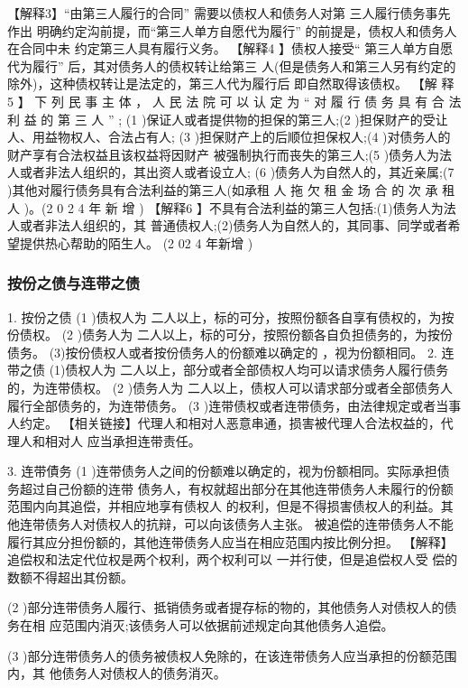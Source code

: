 \documentclass[UTF8,12pt]{ctexart}
\numberwithin{equation}{section} %
\numberwithin{figure}{section}
\numberwithin{table}{section}
\begin{document}
	【解释3】“由第三人履行的合同” 需要以债权人和债务人对第 三人履行债务事先作出 明确约定沟前提，而“第三人单方自愿代为履行” 的前提是，债权人和债务人在合同中未 约定第三人具有履行义务。
	【解释4 】债权人接受“ 第三人单方自愿代为履行” 后，其对债务人的债权转让给第三 人(但是债务人和第三人另有约定的除外)，这种债权转让是法定的，第三人代为履行后 即自然取得该债权。
	【解 释 5 】 下 列 民 事 主 体 ， 人 民 法 院 可 以 认 定 为 “ 对 履 行 债 务 具 有 合 法 利 益 的 第 三 人 ” ; (1 )保证人或者提供物的担保的第三人;(2 )担保财产的受让人、用益物权人、合法占有人; (3 )担保财产上的后顺位担保权人;(4 )对债务人的财产享有合法权益且该权益将因财产 被强制执行而丧失的第三人;(5 )债务人为法人或者非法人组织的，其出资人或者设立人; (6 )债务人为自然人的，其近亲属;(7 )其他对履行债务具有合法利益的第三人(如承租 人 拖 欠 租 金 场 合 的 次 承 租 人 )。(2 0 2 4 年 新 增 )
	【解释6 】不具有合法利益的第三人包括:(1)债务人为法人或者非法人组织的，其 普通债权人;(2)债务人为自然人的，其同事、同学或者希望提供热心帮助的陌生人。 (2 02 4 年新增 )
	
	\subsubsection{按份之债与连带之债}
	1. 按份之债
	(1 )债权人为 二人以上，标的可分，按照份额各自享有债权的，为按份债权。
	(2 )债务人为 二人以上，标的可分，按照份额各自负担债务的，为按份债务。 (3)按份债权人或者按份债务人的份额难以确定的 ，视为份额相同。
	2. 连带之债
	(1)债权人为 二人以上，部分或者全部债权人均可以请求债务人履行债务的，为连带债权。 (2 )债务人为 二人以上，债权人可以请求部分或者全部债务人履行全部债务的，为连带债务。 (3 )连带债权或者连带债务，由法律规定或者当事人约定。 【相关链接】代理人和相对人恶意串通，损害被代理人合法权益的，代理人和相对人 应当承担连带责任。
	
	3. 连带債务
	(1 )连带债务人之间的份额难以确定的，视为份额相同。实际承担债务超过自己份额的连带 债务人，有权就超出部分在其他连带债务人未履行的份额范围内向其追偿，并相应地享有债权人 的权利，但是不得损害债权人的利益。其他连带债务人对债权人的抗辩，可以向该债务人主张。 被追偿的连带债务人不能履行其应分担份额的，其他连带债务人应当在相应范围内按比例分担。
	【解释】追偿权和法定代位权是两个权利，两个权利可以 一并行使，但是追偿权人受 偿的数额不得超出其份额。
	
	(2 )部分连带债务人履行、抵销债务或者提存标的物的，其他债务人对债权人的债务在相 应范围内消灭;该债务人可以依据前述规定向其他债务人追偿。
	
	(3 )部分连带债务人的债务被债权人免除的，在该连带债务人应当承担的份额范围内，其 他债务人对债权人的债务消灭。
	
\end{document}
